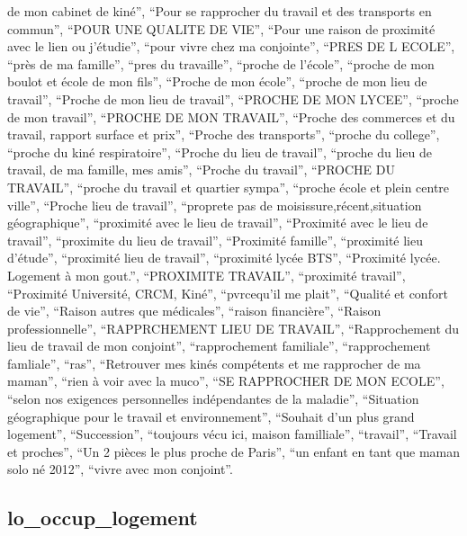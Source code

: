 \documentclass[
  letterpaper,
  DIV=11,
  numbers=noendperiod]{scrartcl}
\begin{document}
\begin{itemize}
  de mon cabinet de kiné'', ``Pour se rapprocher du travail et des
  transports en commun'', ``POUR UNE QUALITE DE VIE'', ``Pour une raison
  de proximité avec le lien ou j'étudie'', ``pour vivre chez ma
  conjointe'', ``PRES DE L ECOLE'', ``près de ma famille'', ``pres du
  travaille'', ``proche de l'école'', ``proche de mon boulot et école de
  mon fils'', ``Proche de mon école'', ``proche de mon lieu de
  travail'', ``Proche de mon lieu de travail'', ``PROCHE DE MON LYCEE'',
  ``proche de mon travail'', ``PROCHE DE MON TRAVAIL'', ``Proche des
  commerces et du travail, rapport surface et prix'', ``Proche des
  transports'', ``proche du college'', ``proche du kiné respiratoire'',
  ``Proche du lieu de travail'', ``proche du lieu de travail, de ma
  famille, mes amis'', ``Proche du travail'', ``PROCHE DU TRAVAIL'',
  ``proche du travail et quartier sympa'', ``proche école et plein
  centre ville'', ``Proche lieu de travail'', ``proprete pas de
  moisissure,récent,situation géographique'', ``proximité avec le lieu
  de travail'', ``Proximité avec le lieu de travail'', ``proximite du
  lieu de travail'', ``Proximité famille'', ``proximité lieu d'étude'',
  ``proximité lieu de travail'', ``proximité lycée BTS'', ``Proximité
  lycée. Logement à mon gout.'', ``PROXIMITE TRAVAIL'', ``proximité
  travail'', ``Proximité Université, CRCM, Kiné'', ``pvrcequ'il me
  plait'', ``Qualité et confort de vie'', ``Raison autres que
  médicales'', ``raison financière'', ``Raison professionnelle'',
  ``RAPPRCHEMENT LIEU DE TRAVAIL'', ``Rapprochement du lieu de travail
  de mon conjoint'', ``rapprochement familiale'', ``rapprochement
  famliale'', ``ras'', ``Retrouver mes kinés compétents et me rapprocher
  de ma maman'', ``rien à voir avec la muco'', ``SE RAPPROCHER DE MON
  ECOLE'', ``selon nos exigences personnelles indépendantes de la
  maladie'', ``Situation géographique pour le travail et
  environnement'', ``Souhait d'un plus grand logement'', ``Succession'',
  ``toujours vécu ici, maison familliale'', ``travail'', ``Travail et
  proches'', ``Un 2 pièces le plus proche de Paris'', ``un enfant en
  tant que maman solo né 2012'', ``vivre avec mon conjoint''.
\end{itemize}

\fullline

\subsection{lo\_occup\_logement}\label{lo_occup_logement}

\bminione
\end{document}
